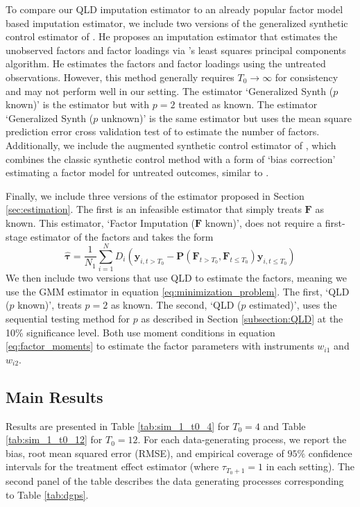 \documentclass[12pt]{article}
\begin{document}
To compare our QLD imputation estimator to an already popular factor model based imputation estimator, we include two versions of the generalized synthetic control estimator of \citet{xu2017generalized}. He proposes an imputation estimator that estimates the unobserved factors and factor loadings via \citet{Bai_2009}'s least squares principal components algorithm. He estimates the factors and factor loadings using the untreated observations. However, this method generally requires $T_0 \rightarrow \infty$ for consistency and may not perform well in our setting. The estimator `Generalized Synth ($p$ known)' is the \citet{xu2017generalized} estimator but with $p = 2$ treated as known. The estimator `Generalized Synth ($p$ unknown)' is the same estimator but uses the mean square prediction error cross validation test of \citet{xu2017generalized} to estimate the number of factors. 
Additionally, we include the augmented synthetic control estimator of \citet{ben2021augmented}, which combines the classic synthetic control method with a form of `bias correction' estimating a factor model for untreated outcomes, similar to \citet{xu2017generalized}.

Finally, we include three versions of the estimator proposed in Section \ref{sec:estimation}. The first is an infeasible estimator that simply treats $\bm F$ as known. This estimator, `Factor Imputation ($\bm F$ known)', does not require a first-stage estimator of the factors and takes the form
\begin{equation}
    \widehat{\bm \tau} = \frac{1}{N_1} \sum_{i = 1}^N D_i \left( \bm y_{i,t > T_0} - \bm P(\bm F_{t > T_0}, \bm F_{t \leq T_0}) \bm y_{i,t \leq T_0} \right)
\end{equation}
We then include two versions that use QLD to estimate the factors, meaning we use the GMM estimator in equation \eqref{eq:minimization_problem}. The first, `QLD ($p$ known)', treats $p = 2$ as known. The second, `QLD ($p$ estimated)', uses the sequential testing method for $p$ as described in Section \ref{subsection:QLD} at the 10\% significance level. Both use moment conditions in equation \eqref{eq:factor_moments} to estimate the factor parameters with instruments $w_{i1}$ and $w_{i2}$.

\subsection{Main Results}

Results are presented in Table \ref{tab:sim_1_t0_4} for $T_0 = 4$ and Table \ref{tab:sim_1_t0_12} for $T_0 = 12$. For each data-generating process, we report the bias, root mean squared error (RMSE), and empirical coverage of $95\%$ confidence intervals for the treatment effect estimator (where $\tau_{T_0 + 1} = 1$ in each setting). The second panel of the table describes the data generating processes corresponding to Table \ref{tab:dgps}.
\end{document}
